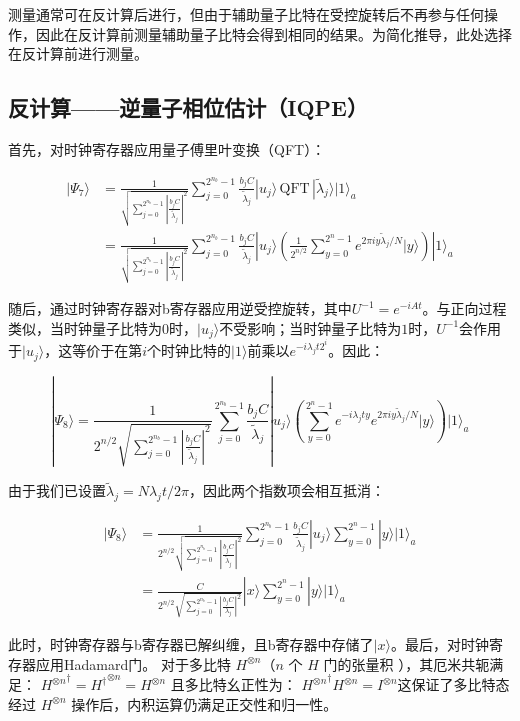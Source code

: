 \documentclass{article}
\begin{document}
测量通常可在反计算后进行，但由于辅助量子比特在受控旋转后不再参与任何操作，因此在反计算前测量辅助量子比特会得到相同的结果。为简化推导，此处选择在反计算前进行测量。


\subsection{反计算——逆量子相位估计（IQPE）}

首先，对时钟寄存器应用量子傅里叶变换（QFT）：

\[
\begin{aligned}
|\Psi_7\rangle &= \frac{1}{\sqrt{\sum_{j=0}^{2^{n_b}-1} \left| \frac{b_j C}{\tilde{\lambda}_j} \right|^2}} \sum_{j=0}^{2^{n_b}-1} \frac{b_j C}{\tilde{\lambda}_j} |u_j\rangle \, \text{QFT} \, |\tilde{\lambda}_j\rangle |1\rangle_a \\
&= \frac{1}{\sqrt{\sum_{j=0}^{2^{n_b}-1} \left| \frac{b_j C}{\tilde{\lambda}_j} \right|^2}} \sum_{j=0}^{2^{n_b}-1} \frac{b_j C}{\tilde{\lambda}_j} |u_j\rangle \left( \frac{1}{2^{n/2}} \sum_{y=0}^{2^n - 1} e^{2\pi i y \tilde{\lambda}_j / N} |y\rangle \right) |1\rangle_a
\end{aligned}
\]

随后，通过时钟寄存器对b寄存器应用逆受控旋转，其中\(U^{-1} = e^{-iAt}\)。与正向过程类似，当时钟量子比特为\(0\)时，\(|u_j\rangle\)不受影响；当时钟量子比特为\(1\)时，\(U^{-1}\)会作用于\(|u_j\rangle\)，这等价于在第\(i\)个时钟比特的\(|1\rangle\)前乘以\(e^{-i\lambda_j t 2^i}\)。因此：

\[
|\Psi_8\rangle = \frac{1}{2^{n/2} \sqrt{\sum_{j=0}^{2^{n_b}-1} \left| \frac{b_j C}{\tilde{\lambda}_j} \right|^2}} \sum_{j=0}^{2^{n_b}-1} \frac{b_j C}{\tilde{\lambda}_j} |u_j\rangle \left( \sum_{y=0}^{2^n - 1} e^{-i\lambda_j t y} e^{2\pi i y \tilde{\lambda}_j / N} |y\rangle \right) |1\rangle_a
\]

由于我们已设置\(\tilde{\lambda}_j = N \lambda_j t / 2\pi\)，因此两个指数项会相互抵消：

\[
\begin{aligned}
|\Psi_8\rangle &= \frac{1}{2^{n/2} \sqrt{\sum_{j=0}^{2^{n_b}-1} \left| \frac{b_j C}{\tilde{\lambda}_j} \right|^2}} \sum_{j=0}^{2^{n_b}-1} \frac{b_j C}{\tilde{\lambda}_j} |u_j\rangle \sum_{y=0}^{2^n - 1} |y\rangle |1\rangle_a \\
&= \frac{C}{2^{n/2} \sqrt{\sum_{j=0}^{2^{n_b}-1} \left| \frac{b_j C}{\lambda_j} \right|^2}} |x\rangle \sum_{y=0}^{2^n - 1} |y\rangle |1\rangle_a
\end{aligned}
\]

此时，时钟寄存器与b寄存器已解纠缠，且b寄存器中存储了\(|x\rangle\)。最后，对时钟寄存器应用Hadamard门。
对于多比特 \( H^{\otimes n} \)（\( n \) 个 \( H \) 门的张量积 ），其厄米共轭满足：
\({H^{\otimes n}}^\dagger = {H^\dagger}^{\otimes n} = H^{\otimes n}\)
且多比特幺正性为：
\({H^{\otimes n}}^\dagger {H^{\otimes n}} = I^{\otimes n}\)这保证了多比特态经过 \( H^{\otimes n} \) 操作后，内积运算仍满足正交性和归一性。
\end{document}
